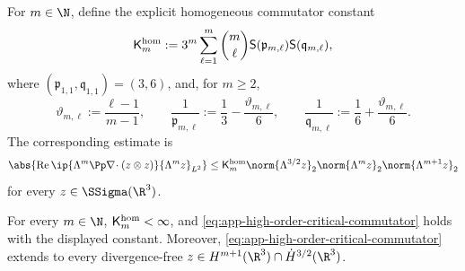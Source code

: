 For \(m\in\N\), define the explicit homogeneous commutator constant
\begin{equation}
 \mathsf K_m^{\rm hom}:=
 3^m\sum_{\ell=1}^m\binom m\ell
 \mathsf S(\mathfrak p_{m,\ell})\mathsf S(\mathfrak q_{m,\ell}),
 \label{eq:app-explicit-homogeneous-commutator-constant}
\end{equation}
where \((\mathfrak p_{1,1},\mathfrak q_{1,1})=(3,6)\), and, for \(m\ge2\),
\[
 \vartheta_{m,\ell}:=\frac{\ell-1}{m-1},
 \qquad
 \frac1{\mathfrak p_{m,\ell}}:=\frac13-\frac{\vartheta_{m,\ell}}6,
 \qquad
 \frac1{\mathfrak q_{m,\ell}}:=\frac16+\frac{\vartheta_{m,\ell}}6.
\]
The corresponding estimate is
\begin{equation}
 \abs{\operatorname{Re}
 \ip{\Lambda^m\Pp\nabla\!\cdot(z\otimes z)}
     {\Lambda^mz}_{L^2}}
 \le
 \mathsf K_m^{\rm hom}
 \norm{\Lambda^{3/2}z}_2
 \norm{\Lambda^mz}_2
 \norm{\Lambda^{m+1}z}_2
 \label{eq:app-high-order-critical-commutator}
\end{equation}
for every \(z\in\SSigma(\R^3)\).

\begin{lemma}
\label{lem:app-critical-commutator}
For every \(m\in\N\), \(\mathsf K_m^{\rm hom}<\infty\), and
\eqref{eq:app-high-order-critical-commutator} holds with the displayed
constant.
Moreover, \eqref{eq:app-high-order-critical-commutator} extends to every
divergence-free
\(z\in H^{m+1}(\R^3)\cap\dot H^{3/2}(\R^3)\).
\end{lemma}

